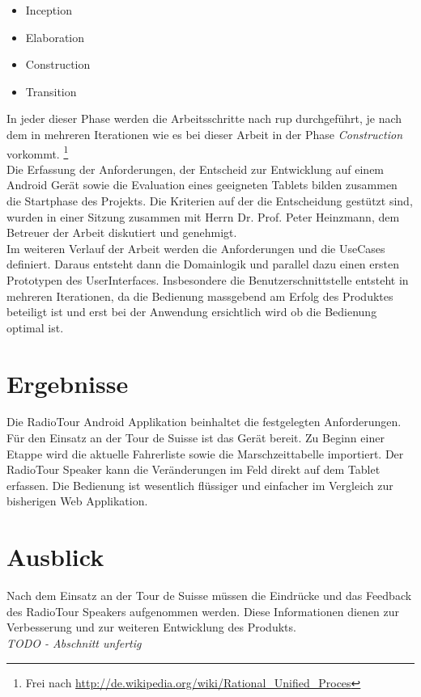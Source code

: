 \begin{itemize}
\item Inception
\item Elaboration
\item Construction
\item Transition
\end{itemize}

In jeder dieser Phase werden die Arbeitsschritte nach \gls{rup} durchgeführt, je nach dem in mehreren Iterationen wie es bei dieser Arbeit in der Phase \textit{Construction} vorkommt. \footnote{Frei nach \url{http://de.wikipedia.org/wiki/Rational_Unified_Proces}}
\\
Die Erfassung der Anforderungen, der Entscheid zur Entwicklung auf einem Android Gerät sowie die Evaluation eines geeigneten Tablets bilden zusammen die Startphase des Projekts. Die Kriterien auf der die Entscheidung gestützt sind, wurden in einer Sitzung zusammen mit Herrn Dr. Prof. Peter Heinzmann, dem Betreuer der Arbeit diskutiert und genehmigt.
\\
Im weiteren Verlauf der Arbeit werden die Anforderungen und die UseCases definiert. Daraus entsteht dann die Domainlogik und parallel dazu einen ersten Prototypen des UserInterfaces. Insbesondere die Benutzerschnittstelle entsteht in mehreren Iterationen, da die Bedienung massgebend am Erfolg des Produktes beteiligt ist und erst bei der Anwendung ersichtlich wird ob die Bedienung optimal ist.

\section{Ergebnisse}
Die RadioTour Android Applikation beinhaltet die festgelegten Anforderungen. Für den Einsatz an der Tour de Suisse ist das Gerät bereit. Zu Beginn einer Etappe wird die aktuelle Fahrerliste sowie die Marschzeittabelle importiert. Der RadioTour Speaker kann die Veränderungen im Feld direkt auf dem Tablet erfassen. Die Bedienung ist wesentlich flüssiger und einfacher im Vergleich zur bisherigen Web Applikation. 
\\

\section{Ausblick}
Nach dem Einsatz an der Tour de Suisse müssen die Eindrücke und das Feedback des RadioTour Speakers aufgenommen werden. Diese Informationen dienen zur Verbesserung und zur weiteren Entwicklung des Produkts.
\\

\textit{TODO - Abschnitt unfertig}